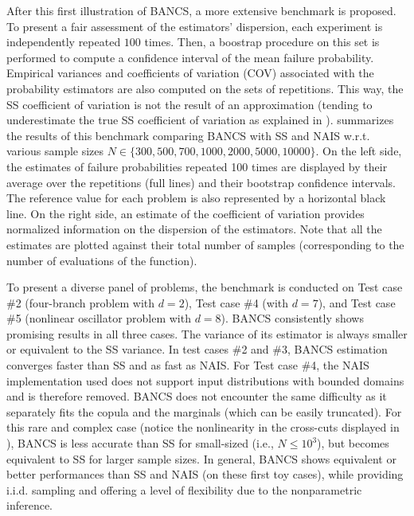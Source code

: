 After this first illustration of BANCS, a more extensive benchmark is proposed. 
To present a fair assessment of the estimators' dispersion, each experiment is independently repeated $100$ times. 
Then, a boostrap procedure on this set is performed to compute a confidence interval of the mean failure probability. 
Empirical variances and coefficients of variation (COV) associated with the probability estimators are also computed on the sets of repetitions. 
This way, the SS coefficient of variation is not the result of an approximation (tending to underestimate the true SS coefficient of variation as explained in \citealp{Papaioannou_PEM_2015}).
 summarizes the results of this benchmark comparing BANCS with SS and NAIS w.r.t. various sample sizes $N \in \{300, 500, 700, 1000, 2000, 5000, 10000\}$.  
On the left side, the estimates of failure probabilities repeated 100 times are displayed by their average over the repetitions (full lines) and their bootstrap confidence intervals. 
The reference value for each problem is also represented by a horizontal black line. 
On the right side, an estimate of the coefficient of variation provides normalized information on the dispersion of the estimators.  
Note that all the estimates are plotted against their total number of samples (corresponding to the number of evaluations of the function). 

To present a diverse panel of problems, the benchmark is conducted on Test case \#2 (four-branch problem with $d=2$), Test case \#4 (with $d=7$), and Test case \#5 (nonlinear oscillator problem with $d=8$). 
BANCS consistently shows promising results in all three cases. 
The variance of its estimator is always smaller or equivalent to the SS variance. 
In test cases \#2 and \#3, BANCS estimation converges faster than SS and as fast as NAIS. 
For Test case \#4, the NAIS implementation used does not support input distributions with bounded domains and is therefore removed. 
BANCS does not encounter the same difficulty as it separately fits the copula and the marginals (which can be easily truncated). 
For this rare and complex case (notice the nonlinearity in the cross-cuts displayed in ), BANCS is less accurate than SS for small-sized (i.e., $N\leq 10^3$), but becomes equivalent to SS for larger sample sizes.
In general, BANCS shows equivalent or better performances than SS and NAIS (on these first toy cases), while providing i.i.d. sampling and offering a level of flexibility due to the nonparametric inference. 

